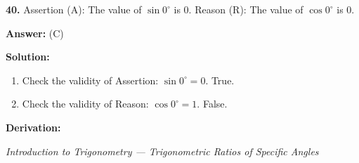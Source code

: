\documentclass[12pt,a4paper]{exam}
\newcommand{\fitmath}[1]{%
  \sbox{\schmathbox}{$\displaystyle #1$}%
  \ifdim\wd\schmathbox>\linewidth
    \resizebox{\linewidth}{!}{\usebox{\schmathbox}}%
  \else
    \usebox{\schmathbox}%
  \fi}
\begin{document}
\begin{questions}
\question \textbf{40.} Assertion (A): The value of $\sin 0^\circ$ is $0$. Reason (R): The value of $\cos 0^\circ$ is $0$.

\textbf{Answer:}
(C)

\textbf{Solution:}
\begin{enumerate}
  \item Check the validity of Assertion: $\sin 0^\circ = 0$. True.
  \item Check the validity of Reason: $\cos 0^\circ = 1$. False.
\end{enumerate}
\textbf{Derivation:}
\begin{center}
\fitmath{\sin 0^\circ = 0, \cos 0^\circ = 1}
\end{center}
\hfill \textit{Introduction to Trigonometry — Trigonometric Ratios of Specific Angles}
\vspace{0.3cm}

\end{questions}
\end{document}
